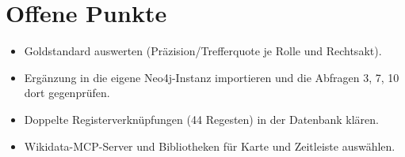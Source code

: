\documentclass[10pt,a4paper]{article}
\begin{document}
\section*{Offene Punkte}
\begin{itemize}
\item Goldstandard auswerten (Präzision/Trefferquote je Rolle und Rechtsakt).
\item Ergänzung in die eigene Neo4j-Instanz importieren und die Abfragen 3, 7, 10 dort gegenprüfen.
\item Doppelte Registerverknüpfungen (44 Regesten) in der Datenbank klären.
\item Wikidata-MCP-Server und Bibliotheken für Karte und Zeitleiste auswählen.
\end{itemize}
\end{document}
